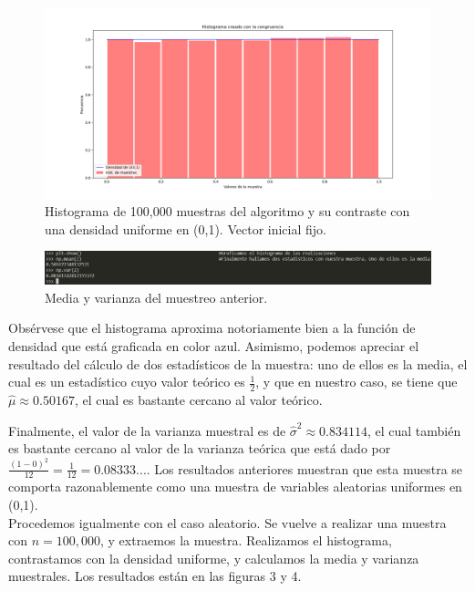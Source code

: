 \documentclass[letterpaper]{article}
\newcommand{\1}{\mathds{1}}
\theoremstyle{definition}
\theoremstyle{definition}
\theoremstyle{definition}
\theoremstyle{definition}
\theoremstyle{definition}
\begin{document}
\begin{enumerate}
    \begin{figure}[h!]
      \centering
      \includegraphics[width=0.9\linewidth]{1.png}
      \caption{Histograma de 100,000 muestras del algoritmo y su contraste con una densidad uniforme en (0,1). Vector inicial fijo.}
  \end{figure} 
  \begin{figure}[h!]
    \centering
    \includegraphics[width=0.9\linewidth]{2.png}
    \caption{Media y varianza del muestreo anterior.}
\end{figure} 

Obsérvese que el histograma aproxima notoriamente bien a la función de densidad que está 
graficada en color azul. Asimismo, podemos apreciar el resultado del cálculo 
de dos estadísticos de la muestra: uno de ellos es la media, el cual es un estadístico 
cuyo valor teórico es $\frac{1}{2}$, y que en nuestro caso, se tiene que $\widehat{\mu}\approx0.50167$,
el cual es bastante cercano al valor teórico.

Finalmente, el valor de la varianza muestral es de $\widehat{\sigma}^2\approx0.834114$, el 
cual también es bastante cercano al valor de la varianza teórica que está dado por $\frac{(1-0)^2}{12}=\frac{1}{12}=0.08333...$.
Los resultados anteriores muestran que esta muestra se comporta razonablemente como una muestra de 
variables aleatorias uniformes en (0,1).\\

Procedemos igualmente con el caso aleatorio. Se vuelve a realizar una muestra con $n=100,000$, y 
extraemos la muestra. Realizamos el histograma, contrastamos con la densidad uniforme, y calculamos 
la media y varianza muestrales. Los resultados están en las figuras 3 y 4.\\


\end{enumerate}
\end{document}
